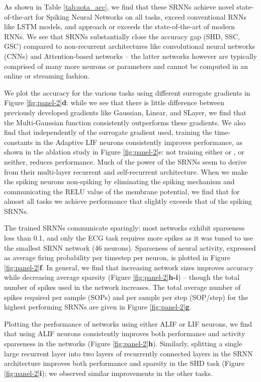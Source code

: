\documentclass[fleqn,10pt]{wlscirep}
\begin{document}
 

As shown in Table \ref{tab:sota_acc}, we find that these SRNNs achieve novel state-of-the-art for Spiking Neural Networks on all tasks, exceed conventional RNNs like LSTM models, and approach or exceeds the state-of-the-art of modern RNNs. We see that SRNNs substantially close the accuracy gap (SHD, SSC, GSC) compared to non-recurrent architectures like convolutional neural networks (CNNs) and Attention-based networks -- the latter networks however are typically comprised of many more neurons or parameters and cannot be computed in an online or streaming fashion. 

We plot the accuracy for the various tasks using different surrogate gradients in Figure \ref{fig:panel-2}\textbf{d}: while we see that there is little difference between previously developed gradients like Gaussian, Linear, and SLayer, we find that the Multi-Gaussian function consistently outperforms these gradients. We also find that independently of the surrogate gradient used, training the time-constants in the Adaptive LIF neurons consistently improves performance, as shown in the ablation study in Figure \ref{fig:panel-2}e: not training either  or , or neither, reduces performance. Much of the power of the SRNNs seem to derive from their multi-layer recurrent and self-recurrent architecture. When we make the spiking neurons non-spiking by eliminating the spiking mechanism and communicating the RELU value of the membrane potential, we find that for almost all tasks we achieve performance that slightly exceeds that of the spiking SRNNs. 

The trained SRNNs communicate sparingly: most networks exhibit sparseness less than 0.1, and only the ECG task requires more spikes as it was tuned to use the smallest SRNN network (46 neurons). Sparseness of neural activity, expressed as average firing probability per timestep per neuron, is plotted in Figure \ref{fig:panel-2}\textbf{f}.
In general, we find that increasing network sizes improves accuracy while decreasing average sparsity (Figure \ref{fig:panel-2}\textbf{h-i}) -- though the total number of spikes used in the network increases. The total average number of spikes required per sample (SOPs) and per sample per step (SOP/step) for the highest performing SRNNs are given in Figure \ref{fig:panel-2}\textbf{g}. 

Plotting the performance of networks using either ALIF or LIF neurons, we find that using ALIF neurons consistently improves both performance and activity sparseness in the networks (Figure \ref{fig:panel-2}\textbf{h}). Similarly, splitting a single large recurrent layer into two layers of recurrently connected layers in the SRNN architecture improves both performance and sparsity in the SHD task (Figure \ref{fig:panel-2}\textbf{i}); we observed similar improvements in the other tasks. 
\end{document}
